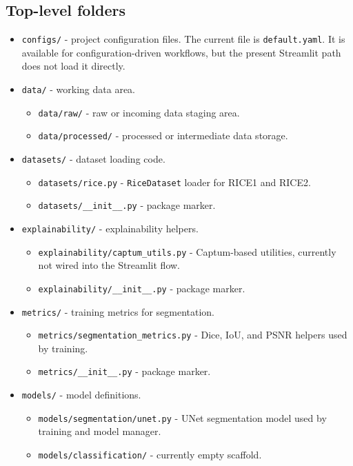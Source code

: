 \documentclass[11pt,a4paper]{article}
\begin{document}
\subsection{Top-level folders}
\begin{itemize}
  \item \verb|configs/| - project configuration files. The current file is \verb|default.yaml|. It is available for configuration-driven workflows, but the present Streamlit path does not load it directly.
  \item \verb|data/| - working data area.
  \begin{itemize}
    \item \verb|data/raw/| - raw or incoming data staging area.
    \item \verb|data/processed/| - processed or intermediate data storage.
  \end{itemize}
  \item \verb|datasets/| - dataset loading code.
  \begin{itemize}
    \item \verb|datasets/rice.py| - \verb|RiceDataset| loader for RICE1 and RICE2.
    \item \verb|datasets/__init__.py| - package marker.
  \end{itemize}
  \item \verb|explainability/| - explainability helpers.
  \begin{itemize}
    \item \verb|explainability/captum_utils.py| - Captum-based utilities, currently not wired into the Streamlit flow.
    \item \verb|explainability/__init__.py| - package marker.
  \end{itemize}
  \item \verb|metrics/| - training metrics for segmentation.
  \begin{itemize}
    \item \verb|metrics/segmentation_metrics.py| - Dice, IoU, and PSNR helpers used by training.
    \item \verb|metrics/__init__.py| - package marker.
  \end{itemize}
  \item \verb|models/| - model definitions.
  \begin{itemize}
    \item \verb|models/segmentation/unet.py| - UNet segmentation model used by training and model manager.
    \item \verb|models/classification/| - currently empty scaffold.

\end{itemize}
\end{itemize}
\end{document}
